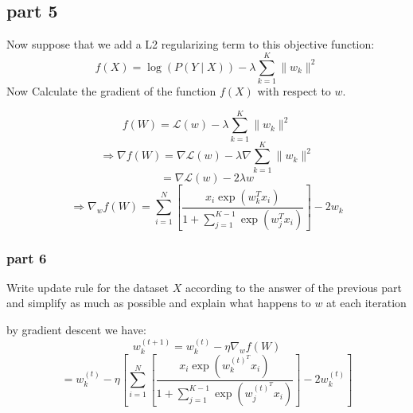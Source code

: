 \subsection{part 5}

Now suppose that we add a L2 regularizing term to this objective function:
\[
f(X) = \log(P(Y \mid X)) - \lambda \sum_{k=1}^K \|w_k\|^2
\]
Now Calculate the gradient of the function $f(X)$ with respect to $w$.
\begin{qsolve}
	\begin{qsolve}[]
		$$
		f(W) = \mathcal{L}(w) - \lambda \sum_{k=1}^K \|w_k\|^2
		$$
		$$
		\Rightarrow \nabla f(W) = \nabla \mathcal{L}(w) - \lambda \nabla \sum_{k=1}^K \|w_k\|^2
		$$
		$$
		= \nabla \mathcal{L}(w) - 2\lambda w
		$$
		$$
		\Rightarrow \nabla_{w} f(W) = \sum_{i=1}^{N} \left[ \frac{x_i \exp(w_k^T x_i)}{1 + \sum_{j=1}^{K-1} \exp(w_j^T x_i)} \right] - 2w_k
		$$
	\end{qsolve}
\end{qsolve}

\subsubsection{part 6}
Write update rule for the dataset $X$ according to the answer of the previous part and simplify as much as possible and explain what happens to $w$ at each iteration
\begin{qsolve}
	\begin{qsolve}[]
		by gradient descent we have:
		$$
		w_{k}^{(t+1)} = w_{k}^{(t)} - \eta \nabla_{w} f(W)
		$$
		$$
		= w_{k}^{(t)} - \eta \left[ \sum_{i=1}^{N} \left[ \frac{x_i \exp(w_k^{(t)^T} x_i)}{1 + \sum_{j=1}^{K-1} \exp(w_j^{(t)^T} x_i)} \right] - 2w_k^{(t)} \right]
		$$
		
	\end{qsolve}
\end{qsolve}
